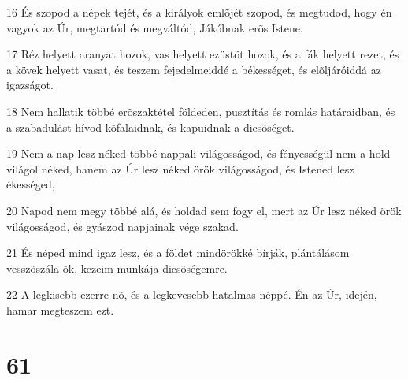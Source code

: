 \par 16 És szopod a népek tejét, és a királyok emlõjét szopod, és megtudod, hogy én vagyok az Úr, megtartód és megváltód, Jákóbnak erõs Istene.
\par 17 Réz helyett aranyat hozok, vas helyett ezüstöt hozok, és a fák helyett rezet, és a kövek helyett vasat, és teszem fejedelmeiddé a békességet, és elõljáróiddá az igazságot.
\par 18 Nem hallatik többé erõszaktétel földeden, pusztítás és romlás határaidban, és a szabadulást hívod kõfalaidnak, és kapuidnak a dicsõséget.
\par 19 Nem a nap lesz néked többé nappali világosságod, és fényességül nem a hold világol néked, hanem az Úr lesz néked örök világosságod, és Istened lesz ékességed,
\par 20 Napod nem megy többé alá, és holdad sem fogy el, mert az Úr lesz néked örök világosságod, és gyászod napjainak vége szakad.
\par 21 És néped mind igaz lesz, és a földet mindörökké bírják, plántálásom vesszõszála õk, kezeim munkája dicsõségemre.
\par 22 A legkisebb ezerre nõ, és a legkevesebb hatalmas néppé. Én az Úr, idején, hamar megteszem ezt.

\chapter{61}

